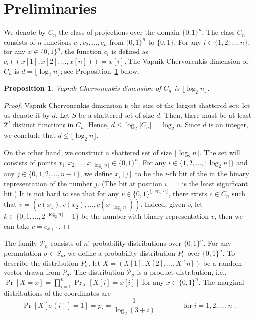 \documentclass[10pt]{article}
\newtheorem{proposition}{Proposition}
\renewcommand{\P}{\mathcal{P}}
\begin{document}
\section{Preliminaries}

We denote by $C_n$ the class of projections over the domain $\{0,1\}^n$. The
class $C_n$ consists of $n$ functions $c_1, c_2, \dots, c_n$ from $\{0,1\}^n$ to
$\{0,1\}$. For any $i \in \{1,2,\dots,n\}$, for any $x \in \{0,1\}^n$,
the function $c_i$ is defined as $c_i((x[1], x[2], \dots, x[n])) = x[i]$.
The Vapnik-Chervonenkis dimension of $C_n$ is $d = \lfloor \log_2 n \rfloor$; see
Proposition~\ref{proposition:vc-dimension-projections} below.

\begin{proposition}
\label{proposition:vc-dimension-projections}
Vapnik-Chervonenkis dimension of $C_n$ is $\lfloor \log_2 n \rfloor$.
\end{proposition}

\begin{proof}
Vapnik-Chervonenkis dimension is the size of the largest shattered set; let us
denote it by $d$. Let $S$ be a shattered set of size $d$. Then, there must be at
least $2^d$ distinct functions in $C_n$. Hence, $d \le \log_2 |C_n| =
\log_2 n$. Since $d$ is an integer, we conclude that $d \le \lfloor \log_2 n
\rfloor$.

On the other hand, we construct a shattered set of size $\lfloor \log_2 n
\rfloor$. The set will consists of points $x_1, x_2, \dots, x_{\lfloor \log_2 n
\rfloor} \in \{0,1\}^n$. For any $i \in \{1,2,\dots,\lfloor \log_2 n \rfloor\}$
and any $j \in \{0,1,2,\dots,n-1\}$, we define $x_i[j]$ to be the $i$-th bit of the
in the binary representation of the number $j$. (The bit at position $i=1$ is the
least significant bit.) It is not hard to see that for any $v \in
\{0,1\}^{\lfloor \log_2 n \rfloor}$, there exists $c \in C_n$ such that $v =
(c(x_1), c(x_2), \dots, c(x_{\lfloor \log_2 n \rfloor}))$. Indeed, given $v$,
let $k \in \{0,1,\dots,2^{\lfloor \log_2 n \rfloor} - 1\}$ be the number with
binary representation $v$, then we can take $c = c_{k+1}$.
\end{proof}

The family $\P_n$ consists of $n!$ probability distributions over
$\{0,1\}^n$. For any permutation $\sigma \in S_n$, we define a probability distribution
$P_{\sigma}$ over $\{0,1\}^n$. To describe the distribution $P_\sigma$, let $X = (X[1],
X[2], \dots, X[n])$ be a random vector drawn from $P_\sigma$.
The distribution $\P_\sigma$ is a product distribution,
i.e., $\Pr[X = x] = \prod_{i=1}^n \Pr_{X}[X[i] = x[i]]$
for any $x \in \{0,1\}^n$. The marginal distributions
of the coordinates are
$$
\Pr[X[\sigma(i)] = 1] = p_i = \frac{1}{\log_2(3 + i)} \qquad \qquad \text{for $i=1,2,\dots,n$} \; .
$$
\end{document}
